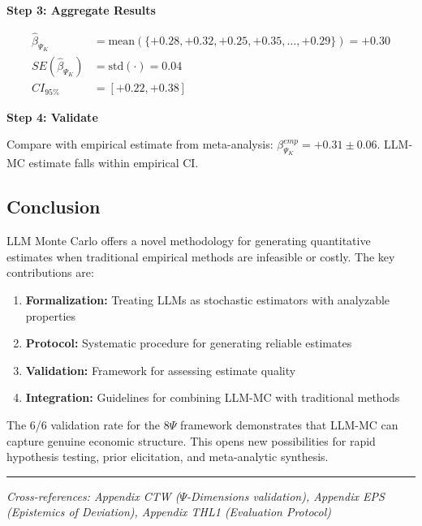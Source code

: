 \begin{tcolorbox}[colback=blue!5!white, colframe=blue!75!black,
    title=\textbf{Worked Example: LLM-MC Protocol Application}]
\textbf{Step 3: Aggregate Results}

\begin{align*}
\hat{\beta}_{\Psi_K} &= \text{mean}(\{+0.28, +0.32, +0.25, +0.35, \ldots, +0.29\}) = +0.30 \\
SE(\hat{\beta}_{\Psi_K}) &= \text{std}(\cdot) = 0.04 \\
CI_{95\%} &= [+0.22, +0.38]
\end{align*}

\textbf{Step 4: Validate}

Compare with empirical estimate from meta-analysis: $\beta_{\Psi_K}^{emp} = +0.31 \pm 0.06$.
LLM-MC estimate falls within empirical CI. \checkmark

\end{tcolorbox}


\subsection{Conclusion}

LLM Monte Carlo offers a novel methodology for generating quantitative estimates when traditional empirical methods are infeasible or costly. The key contributions are:

\begin{enumerate}
    \item \textbf{Formalization:} Treating LLMs as stochastic estimators with analyzable properties
    \item \textbf{Protocol:} Systematic procedure for generating reliable estimates
    \item \textbf{Validation:} Framework for assessing estimate quality
    \item \textbf{Integration:} Guidelines for combining LLM-MC with traditional methods
\end{enumerate}

The 6/6 validation rate for the 8$\Psi$ framework demonstrates that LLM-MC can capture genuine economic structure. This opens new possibilities for rapid hypothesis testing, prior elicitation, and meta-analytic synthesis.

\vspace{1em}
\hrule
\vspace{0.5em}
\noindent\textit{Cross-references: Appendix CTW ($\Psi$-Dimensions validation), Appendix EPS (Epistemics of Deviation), Appendix THL1 (Evaluation Protocol)}

